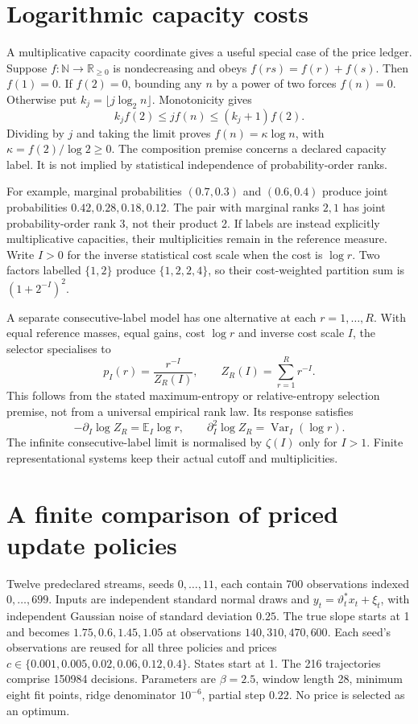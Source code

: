 \section{Logarithmic capacity costs}
\label{app:rank}

A multiplicative capacity coordinate gives a useful special case of the price ledger. Suppose
\(f:\mathbb N\to\mathbb R_{\geq0}\) is nondecreasing and obeys
\(f(rs)=f(r)+f(s)\).
Then \(f(1)=0\). If \(f(2)=0\), bounding any \(n\) by a power of two forces \(f(n)=0\). Otherwise put \(k_j=\lfloor j\log_2n\rfloor\). Monotonicity gives
\[
 k_jf(2)\leq jf(n)\leq(k_j+1)f(2).
\]
Dividing by \(j\) and taking the limit proves
\(f(n)=\kappa\log n\), with \(\kappa=f(2)/\log2\geq0\).
The composition premise concerns a declared capacity label. It is not implied by statistical independence of probability-order ranks.

For example, marginal probabilities \((0.7,0.3)\) and \((0.6,0.4)\) produce joint probabilities \(0.42,0.28,0.18,0.12\). The pair with marginal ranks \(2,1\) has joint probability-order rank 3, not their product 2. If labels are instead explicitly multiplicative capacities, their multiplicities remain in the reference measure. Write \(I>0\) for the inverse statistical cost scale when the cost is \(\log r\). Two factors labelled \(\{1,2\}\) produce \(\{1,2,2,4\}\), so their cost-weighted partition sum is \((1+2^{-I})^2\).

A separate consecutive-label model has one alternative at each \(r=1,\ldots,R\). With equal reference masses, equal gains, cost \(\log r\) and inverse cost scale \(I\), the selector specialises to
\[
 p_I(r)=\frac{r^{-I}}{Z_R(I)},\qquad
 Z_R(I)=\sum_{r=1}^Rr^{-I}.
\]
This follows from the stated maximum-entropy or relative-entropy selection premise, not from a universal empirical rank law. Its response satisfies
\[
 -\partial_I\log Z_R=\mathbb E_I\log r,\qquad
 \partial_I^2\log Z_R=\operatorname{Var}_I(\log r).
\]
The infinite consecutive-label limit is normalised by \(\zeta(I)\) only for \(I>1\). Finite representational systems keep their actual cutoff and multiplicities.
\section{A finite comparison of priced update policies}
\label{app:protocol}

Twelve predeclared streams, seeds \(0,\ldots,11\), each contain 700 observations indexed \(0,\ldots,699\). Inputs are independent standard normal draws and \(y_t=\vartheta_t^*x_t+\xi_t\), with independent Gaussian noise of standard deviation \(0.25\). The true slope starts at 1 and becomes \(1.75,0.6,1.45,1.05\) at observations \(140,310,470,600\). Each seed's observations are reused for all three policies and prices \(c\in\{0.001,0.005,0.02,0.06,0.12,0.4\}\). States start at 1. The 216 trajectories comprise 150984 decisions. Parameters are \(\beta=2.5\), window length 28, minimum eight fit points, ridge denominator \(10^{-6}\), partial step \(0.22\). No price is selected as an optimum.


